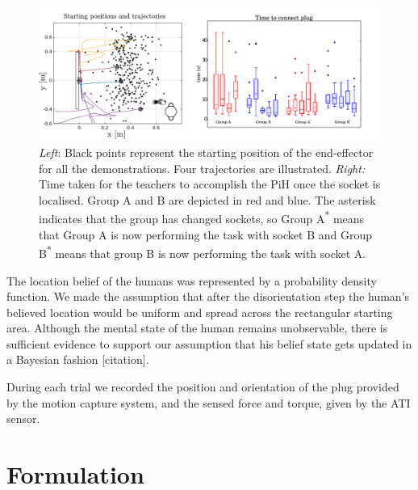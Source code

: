 \begin{figure}
 \centering
   \includegraphics[width=\textwidth]{./ch4-PiH/Figures/Fig/ex_setup_data.pdf}
   \caption{\textit{Left}: Black points represent the starting position of the end-effector
   for all the demonstrations. Four trajectories are illustrated. \textit{Right:} 
   Time taken for the teachers to accomplish the PiH once the socket is localised. Group A and B are depicted in red 
   and blue. The asterisk indicates that the group has changed sockets, so Group A\textsuperscript{*} means
   that Group A is now performing the task with socket B and Group B\textsuperscript{*} means that group B is now performing 
   the task with socket A.}
  \label{fig:experiment_setup_data}
\end{figure}

The location belief of the humans was represented by a probability density function. We made the assumption 
that after the disorientation step the human's believed location would be uniform and spread across the 
rectangular starting area. Although the mental state of the human remains 
unobservable, there is sufficient evidence to support our assumption that his belief state
gets updated in a Bayesian fashion [citation].

During each trial we recorded the position and orientation of the plug provided by the motion capture 
system, and the sensed force and torque, given by the ATI sensor. 


\section{Formulation}\label{ch4:formulation}

